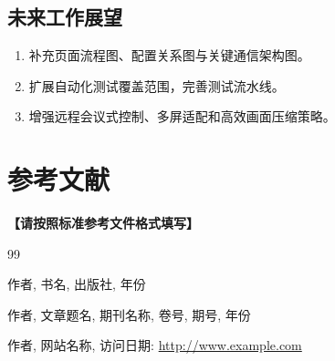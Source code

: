 \documentclass[12pt,a4paper]{article}
\begin{document}
\subsection{未来工作展望}

\begin{enumerate}
    \item 补充页面流程图、配置关系图与关键通信架构图。
    \item 扩展自动化测试覆盖范围，完善测试流水线。
    \item 增强远程会议式控制、多屏适配和高效画面压缩策略。
\end{enumerate}

\section*{参考文献}

\textbf{【请按照标准参考文件格式填写】}

\begin{thebibliography}{99}

 作者, 书名, 出版社, 年份

 作者, 文章题名, 期刊名称, 卷号, 期号, 年份

 作者, 网站名称, 访问日期: \url{http://www.example.com}

\end{thebibliography}
\end{document}
